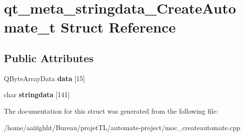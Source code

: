 \hypertarget{structqt__meta__stringdata___create_automate__t}{\section{qt\-\_\-meta\-\_\-stringdata\-\_\-\-Create\-Automate\-\_\-t Struct Reference}
\label{structqt__meta__stringdata___create_automate__t}
}
\subsection*{Public Attributes}
\begin{DoxyCompactItemize}
\item 
\hypertarget{structqt__meta__stringdata___create_automate__t_a135025ee8de64b109b0b4750e435acba}{Q\-Byte\-Array\-Data {\bfseries data} \mbox{[}15\mbox{]}}\label{structqt__meta__stringdata___create_automate__t_a135025ee8de64b109b0b4750e435acba}

\item 
\hypertarget{structqt__meta__stringdata___create_automate__t_a805bae912b078b7c9714849695edcffa}{char {\bfseries stringdata} \mbox{[}141\mbox{]}}\label{structqt__meta__stringdata___create_automate__t_a805bae912b078b7c9714849695edcffa}

\end{DoxyCompactItemize}


The documentation for this struct was generated from the following file\-:\begin{DoxyCompactItemize}
\item 
/home/aaiiighht/\-Bureau/projet\-T\-L/automate-\/project/moc\-\_\-createautomate.\-cpp\end{DoxyCompactItemize}
